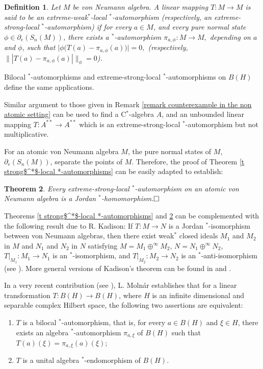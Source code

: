 \documentclass[11pt]{amsart}
\newtheorem{theorem}{Theorem}[section]
\newtheorem{definition}[theorem]{Definition}
\begin{document}
\begin{definition}\label{def extreme weak$^*$-local $^*$-automorphism} Let $M$ be von Neumann algebra. A linear mapping $T: M \to M$ is said to be an extreme-weak$^*$-local $^*$-automorphism {\rm(}respectively, an extreme-strong-local $^*$-automorphism{\rm)} if for every $a\in M$, and every pure normal state $\phi\in \partial_{e} (S_n(M))$, there exists a $^*$-automorphism $\pi_{a,\phi}: M\to M,$ depending on $a$ and $\phi$, such that $\Big|\phi \Big(T(a) - \pi_{a,\phi} (a)\Big)\Big|=0,$ {\rm(}respectively, $\||T(a) - \pi_{a,\phi} (a)|\|_{\phi }=0${\rm)}.
\end{definition}

Bilocal $^*$-automorphisms and extreme-strong-local $^*$-automorphisms on  $B(H)$ define the same applications.\smallskip

Similar argument to those given in Remark \ref{remark counterexample in the non atomic setting} can be used to find a C$^*$-algebra $A$, and an unbounded linear mapping $T: A^{**}\to A^{**}$ which is an extreme-strong-local $^*$-automorphism but not multiplicative.\smallskip

For an atomic von Neumann algebra $M$, the pure normal states of $M$, $\partial_e (S_n(M))$, separate the points of $M$. Therefore, the proof of Theorem \ref{t strong$^*$-local *-automorphisms} can be easily adapted to establish:

\begin{theorem}\label{t extreme-strong-local *-automorphisms} Every extreme-strong-local $^*$-automorphism on an atomic von Neumann algebra is a Jordan $^*$-homomorphism.$\hfill\Box$
\end{theorem}

Theorems \ref{t strong$^*$-local *-automorphisms} and \ref{t extreme-strong-local *-automorphisms} can be complemented with the following result due to R. Kadison: If $T: M \to N$ is a Jordan $^*$-isomorphism between von Neumann algebras, then there exist weak$^*$ closed ideals $M_1$ and $M_2$
in $M$ and $N_1$ and $N_2$ in $N$ satisfying $M = M_1 \oplus^{\infty} M_2$, $N= N_1 \oplus^{\infty} N_2$, $T|_{M_1} :M_1 \to N_1$ is an $^*$-isomorphism, and $T|_{M_2} : M_2 \to N_2$ is an $^*$-anti-isomorphism (see \cite[Theorem 10]{Kad51}). More general versions of Kadison's theorem can be found in \cite[\S 3]{Stor1965} and \cite{Bre89}.\smallskip

In a very recent contribution (see \cite[Theorem 1]{Mol2014}), L. Moln\'{a}r establishes that for a linear transformation $T: B(H)\to B(H)$, where $H$ is an infinite dimensional and separable complex Hilbert space, the following two assertions are equivalent:\begin{enumerate}[$(a)$]\item $T$ is a bilocal $^*$-automorphism, that is, for every $a\in B(H)$ and $\xi \in H$, there exists an algebra $^*$-automorphism $\pi_{a,\xi}$ of $B(H)$ such that $T(a) (\xi) = \pi_{a,\xi} (a) (\xi)$;
\item $T$ is a unital algebra $^*$-endomorphism of $B(H)$.
\end{enumerate}
\end{document}
